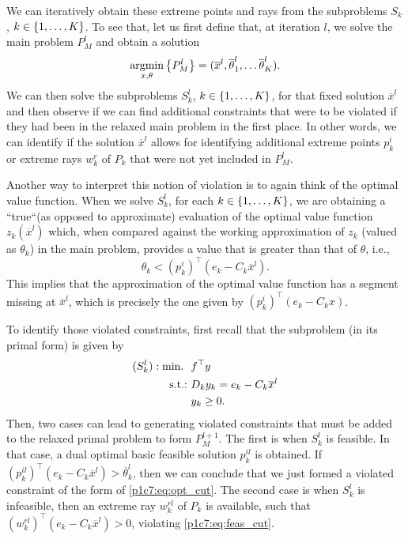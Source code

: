 We can iteratively obtain these extreme points and rays from the subproblems $S_k$, $k \in \left\{ 1, \dots, K \right \}$. To see that, let us first define that, at iteration $l$, we solve the main problem $P_M^l$ and obtain a solution
%
\begin{equation*}
	\mathop{\rm argmin}_{x, \theta} \left\{ P_M^l \right \} = (\overline{x}^l, \overline{\theta}^l_1, \dots \overline{\theta}^l_K). 
\end{equation*}
%
We can then solve the subproblems $S_k^l$, $k \in \left\{ 1, \dots, K \right \}$, for that fixed solution $\overline{x}^l$ and then observe if we can find additional constraints that were to be violated if they had been in the relaxed main problem in the first place. In other words, we can identify if the solution $\overline{x}^l$ allows for identifying additional extreme points $p^i_k$ or extreme rays $w^r_k$ of $P_k$ that were not yet included in $P_M^l$. 

Another way to interpret this notion of violation is to again think of the optimal value function. When we solve $S_k^l$, for each $k \in \left\{ 1, \dots, K \right \}$, we are obtaining a ``true``(as opposed to approximate) evaluation of the optimal value function $z_k(\overline{x}^l)$ which, when compared against the working approximation of $z_k$ (valued as $\theta_k$) in the main problem, provides a value that is greater than that of $\theta$, i.e.,
%
\begin{equation}
	\theta_k < (p^i_k)^\top (e_k - C_k \overline{x}^l).
\end{equation}
%
This implies that the approximation of the optimal value function has a segment missing at $\overline{x}^l$, which is precisely the one given by $(p^i_k)^\top (e_k - C_k x)$. 




To identify those violated constraints, first recall that the subproblem (in its primal form) is given by
%
\begin{align*}
	(S_k^l): \mathop{\text{min.~}} \ & f^\top y \\
	\mathop{\text{s.t.:~}} & D_k y_k = e_k - C_k \overline{x}^l \\
	& y_k \geq 0.
\end{align*}
%
Then, two cases can lead to generating violated constraints that must be added to the relaxed primal problem to form $P_M^{l+1}$. The first is when $S_k^l$ is feasible. In that case, a dual optimal basic feasible solution $p^{il}_{k}$ is obtained. If $(p^{il}_k)^\top(e_k - C_k \overline{x}^l) > \overline{\theta}_k^l$, then we can conclude that we just formed a violated constraint of the form of \eqref{p1c7:eq:opt_cut}. The second case is when $S_k^l$ is infeasible, then an extreme ray $w^{rl}_k$ of $P_k$ is available, such that $(w^{rl}_k)^\top(e_k - C_k \overline{x}^l) > 0$, violating \eqref{p1c7:eq:feas_cut}. 

